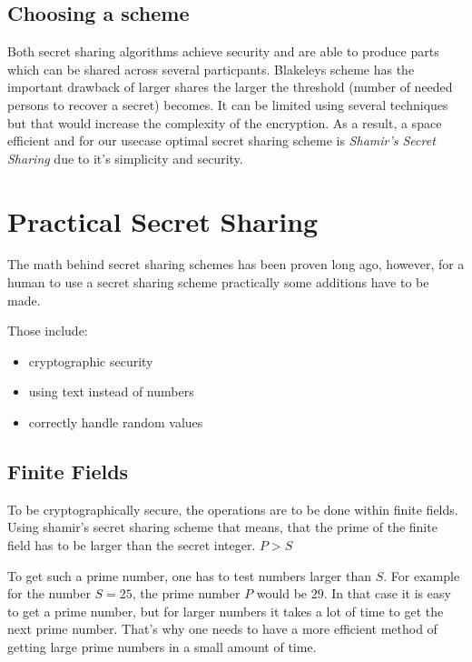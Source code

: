 \subsection{Choosing a scheme}

Both secret sharing algorithms achieve security and are able to produce
parts which can be shared across several particpants. Blakeleys scheme
has the important drawback of larger shares the larger the threshold (number
of needed persons to recover a secret) becomes. It can be limited using
several techniques but that would increase the complexity of the encryption.
As a result, a space efficient and for our usecase optimal secret sharing
scheme is \textit{Shamir's Secret Sharing} due to it's simplicity and
security.

\section{Practical Secret Sharing}

The math behind secret sharing schemes has been proven long ago, however, for a
human to use a secret sharing scheme practically some additions have to be
made.

Those include:

\begin{itemize}
  \item cryptographic security
  \item using text instead of numbers
  \item correctly handle random values
\end{itemize}

\subsection{Finite Fields}

To be cryptographically secure, the operations are to be done within finite
fields. Using shamir's secret sharing scheme that means, that the prime of the
finite field has to be larger than the secret integer. $P > S$

To get such a prime number, one has to test numbers larger than $S$. For example
for the number $S = 25$, the prime number $P$ would be $29$. In that case it is
easy to get a prime number, but for larger numbers it takes a lot of time to get
the next prime number. That's why one needs to have a more efficient method of
getting large prime numbers in a small amount of time.

